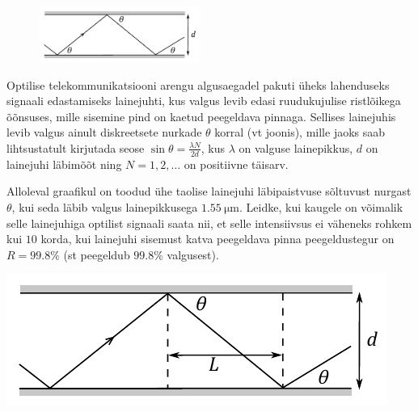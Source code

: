 
\begin{figure}
  \begin{center}
		\vspace{-15pt}
		\includegraphics[width=0.47\textwidth]{2021-v2g-08-yl.pdf}
		\vspace{-35pt}
  \end{center}
\end{figure}
Optilise telekommunikatsiooni arengu algusaegadel pakuti üheks lahenduseks signaali edastamiseks lainejuhti, kus valgus levib edasi ruudukujulise ristlõikega õõnsuses, mille sisemine pind on kaetud peegeldava pinnaga. Sellises lainejuhis levib valgus ainult diskreetsete nurkade $\theta$ korral (vt joonis), mille jaoks saab lihtsustatult kirjutada seose $\sin\theta=\tfrac{\lambda N}{2d}$, kus $\lambda$ on valguse lainepikkus, $d$ on lainejuhi läbimõõt ning $N=1,2,\dots$ on positiivne täisarv.

Alloleval graafikul on toodud ühe taolise lainejuhi läbipaistvuse sõltuvust nurgast $\theta$, kui seda läbib valgus lainepikkusega $\SI{1.55}{\micro\m}$. Leidke, kui kaugele on võimalik selle lainejuhiga optilist signaali saata nii, et selle intensiivsus ei väheneks rohkem kui $10$ korda, kui lainejuhi sisemust katva peegeldava pinna peegeldustegur on $R=99.8\%$ (st peegeldub $99.8\%$ valgusest).

\begin{figure}[H]
	\centering
	
	\vspace{-45pt}
\end{figure}


\hint

\solu
\begin{center}
\includegraphics[]{2021-v2g-08-sol.pdf}
\end{center}

